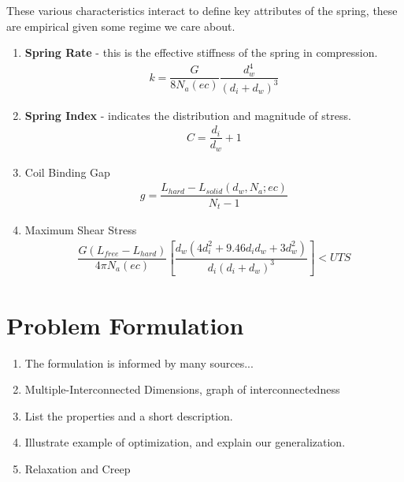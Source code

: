 \documentclass[11pt]{article}
\begin{document}
These various characteristics interact to define key attributes of the spring, these are empirical given some regime we care about.

	\begin{enumerate}
		\item \textbf{Spring Rate} - this is the effective stiffness of the spring in compression.
\begin{align*}
		k = \dfrac{G}{8 N_{a} (ec)} \dfrac{d_{w}^{4}}{(d_{i}+d_{w})^{3}}
\end{align*}
		\item \textbf{Spring Index} - indicates the distribution and magnitude of stress.
\begin{align*}
		C = \dfrac{d_{i}}{d_{w}} + 1
\end{align*}
		\item Coil Binding Gap
\begin{align*}
	g = \dfrac{L_{hard} - L_{solid}(d_{w},N_{a}; ec)}{N_{t} - 1}
\end{align*}
		\item Maximum Shear Stress
\begin{align*}
		\dfrac{G(L_{free} - L_{hard})}{4 \pi N_{a} (ec)} [\dfrac{d_{w} (4d_{i}^{2} + 9.46d_{i} 
d_{w} + 3 d_{w}^{2})}{d_{i}(d_{i}+d_{w})^{3}}] < UTS
\end{align*}
	\end{enumerate}


\section{Problem Formulation}

	\begin{enumerate}
	
		\item The formulation is informed by many sources... 
				
		\item Multiple-Interconnected Dimensions, graph of interconnectedness
	
		\item List the properties and a short description.

		

		\item Illustrate example of optimization, and explain our generalization.
		
		\item Relaxation and Creep
		
	\end{enumerate}
	
\end{document}
